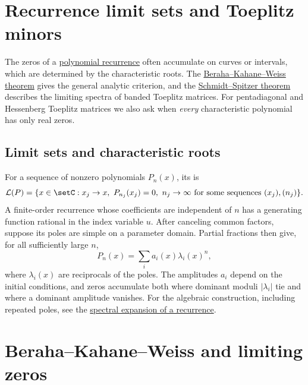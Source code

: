 
\section[toeplitzDeterminants]{Recurrence limit sets and Toeplitz minors}

The zeros of a \hyperref[polynomialRecurrences]{polynomial recurrence}
often accumulate on curves or intervals, which are determined by the
characteristic roots. The
\hyperref[toeplitzBkwTheorem]{Beraha--Kahane--Weiss theorem}
gives the general analytic criterion, and the
\hyperref[toeplitzSchmidtSpitzer]{Schmidt--Spitzer theorem}
describes the limiting spectra of banded Toeplitz matrices.
For pentadiagonal and Hessenberg Toeplitz matrices we also ask when
\emph{every} characteristic polynomial has only real zeros.

\subsection[recurrenceZeroLimitSets]{Limit sets and characteristic roots}

For a sequence of nonzero polynomials $P_n(x)$, its  is
\[
 \mathcal L(P)=\{x\in\setC:
   x_j\to x,\ P_{n_j}(x_j)=0,\ n_j\to\infty
   \text{ for some sequences }(x_j),(n_j)\}.
\]
A finite-order recurrence whose coefficients are independent of $n$
has a generating function rational in the index variable $u$.
After canceling common factors, suppose its poles are simple on a parameter
domain. Partial fractions then give, for all sufficiently large $n$,
\[
 P_n(x)=\sum_i a_i(x)\lambda_i(x)^n,
\]
where $\lambda_i(x)$ are reciprocals of the poles.
The amplitudes $a_i$ depend on the initial conditions, and zeros
accumulate both where dominant moduli $|\lambda_i|$ tie and where a
dominant amplitude vanishes.
For the algebraic construction, including repeated poles, see the
\hyperref[recurrenceSpectralModel]{spectral expansion of a recurrence}.

\section[toeplitzBkw]{Beraha--Kahane--Weiss and limiting zeros}

